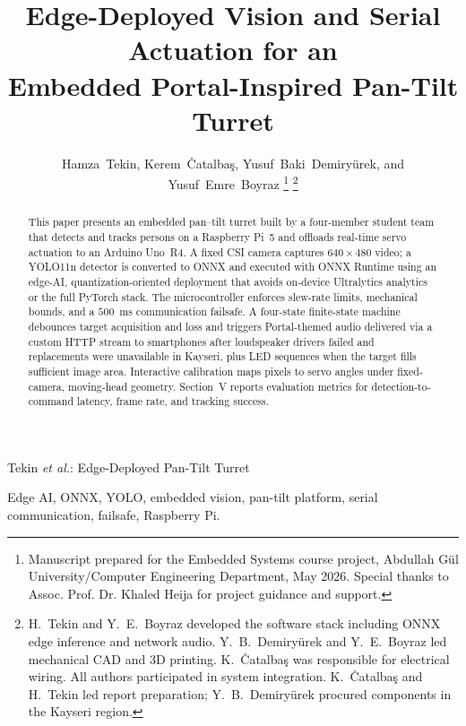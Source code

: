 \documentclass[lettersize,journal]{IEEEtran}
\begin{document}
\title{Edge-Deployed Vision and Serial Actuation for an\\ Embedded Portal-Inspired Pan-Tilt Turret}

\author{Hamza~Tekin, Kerem~\.{C}atalba\c{s}, Yusuf~Baki~Demiry\"{u}rek, and Yusuf~Emre~Boyraz%
\thanks{Manuscript prepared for the Embedded Systems course project, Abdullah G\"{u}l University/Computer Engineering Department, May 2026. Special thanks to Assoc. Prof. Dr. Khaled Heija for project guidance and support.}%
\thanks{H.~Tekin and Y.~E.~Boyraz developed the software stack including ONNX edge inference and network audio. Y.~B.~Demiry\"{u}rek and Y.~E.~Boyraz led mechanical CAD and 3D printing. K.~\.{C}atalba\c{s} was responsible for electrical wiring. All authors participated in system integration. K.~\.{C}atalba\c{s} and H.~Tekin led report preparation; Y.~B.~Demiry\"{u}rek procured components in the Kayseri region.}}

%
{Tekin \MakeLowercase{\textit{et al.}}: Edge-Deployed Pan-Tilt Turret}

\maketitle

\begin{abstract}
This paper presents an embedded pan--tilt turret built by a four-member student team that detects and tracks persons on a Raspberry Pi~5 and offloads real-time servo actuation to an Arduino Uno~R4. A fixed CSI camera captures $640\times480$ video; a YOLO11n detector is converted to ONNX and executed with ONNX Runtime using an edge-AI, quantization-oriented deployment that avoids on-device Ultralytics analytics or the full PyTorch stack. The microcontroller enforces slew-rate limits, mechanical bounds, and a $500$~ms communication failsafe. A four-state finite-state machine debounces target acquisition and loss and triggers Portal-themed audio delivered via a custom HTTP stream to smartphones after loudspeaker drivers failed and replacements were unavailable in Kayseri, plus LED sequences when the target fills sufficient image area. Interactive calibration maps pixels to servo angles under fixed-camera, moving-head geometry. Section~V reports evaluation metrics for detection-to-command latency, frame rate, and tracking success.
\end{abstract}

\begin{IEEEkeywords}
Edge AI, ONNX, YOLO, embedded vision, pan-tilt platform, serial communication, failsafe, Raspberry Pi.
\end{IEEEkeywords}
\end{document}
